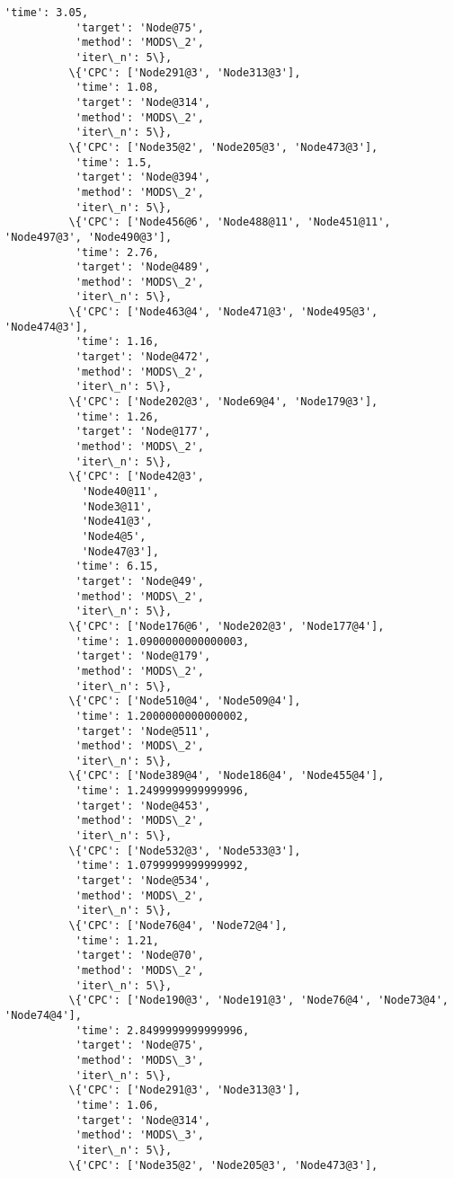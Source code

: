 \documentclass[11pt]{article}
\begin{document}
\begin{Verbatim}[commandchars=\\\{\}]
           'time': 3.05,
           'target': 'Node@75',
           'method': 'MODS\_2',
           'iter\_n': 5\},
          \{'CPC': ['Node291@3', 'Node313@3'],
           'time': 1.08,
           'target': 'Node@314',
           'method': 'MODS\_2',
           'iter\_n': 5\},
          \{'CPC': ['Node35@2', 'Node205@3', 'Node473@3'],
           'time': 1.5,
           'target': 'Node@394',
           'method': 'MODS\_2',
           'iter\_n': 5\},
          \{'CPC': ['Node456@6', 'Node488@11', 'Node451@11', 'Node497@3', 'Node490@3'],
           'time': 2.76,
           'target': 'Node@489',
           'method': 'MODS\_2',
           'iter\_n': 5\},
          \{'CPC': ['Node463@4', 'Node471@3', 'Node495@3', 'Node474@3'],
           'time': 1.16,
           'target': 'Node@472',
           'method': 'MODS\_2',
           'iter\_n': 5\},
          \{'CPC': ['Node202@3', 'Node69@4', 'Node179@3'],
           'time': 1.26,
           'target': 'Node@177',
           'method': 'MODS\_2',
           'iter\_n': 5\},
          \{'CPC': ['Node42@3',
            'Node40@11',
            'Node3@11',
            'Node41@3',
            'Node4@5',
            'Node47@3'],
           'time': 6.15,
           'target': 'Node@49',
           'method': 'MODS\_2',
           'iter\_n': 5\},
          \{'CPC': ['Node176@6', 'Node202@3', 'Node177@4'],
           'time': 1.0900000000000003,
           'target': 'Node@179',
           'method': 'MODS\_2',
           'iter\_n': 5\},
          \{'CPC': ['Node510@4', 'Node509@4'],
           'time': 1.2000000000000002,
           'target': 'Node@511',
           'method': 'MODS\_2',
           'iter\_n': 5\},
          \{'CPC': ['Node389@4', 'Node186@4', 'Node455@4'],
           'time': 1.2499999999999996,
           'target': 'Node@453',
           'method': 'MODS\_2',
           'iter\_n': 5\},
          \{'CPC': ['Node532@3', 'Node533@3'],
           'time': 1.0799999999999992,
           'target': 'Node@534',
           'method': 'MODS\_2',
           'iter\_n': 5\},
          \{'CPC': ['Node76@4', 'Node72@4'],
           'time': 1.21,
           'target': 'Node@70',
           'method': 'MODS\_2',
           'iter\_n': 5\},
          \{'CPC': ['Node190@3', 'Node191@3', 'Node76@4', 'Node73@4', 'Node74@4'],
           'time': 2.8499999999999996,
           'target': 'Node@75',
           'method': 'MODS\_3',
           'iter\_n': 5\},
          \{'CPC': ['Node291@3', 'Node313@3'],
           'time': 1.06,
           'target': 'Node@314',
           'method': 'MODS\_3',
           'iter\_n': 5\},
          \{'CPC': ['Node35@2', 'Node205@3', 'Node473@3'],

\end{Verbatim}
\end{document}
